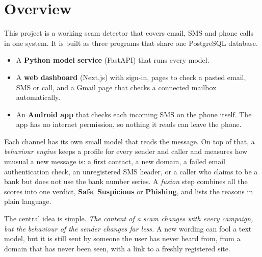 {\section{Overview}
This project is a working scam detector that covers email, SMS and phone calls in one system. It is built as three programs that share one PostgreSQL database.
\begin{itemize}
\item A \textbf{Python model service} (FastAPI) that runs every model.
\item A \textbf{web dashboard} (Next.js) with sign-in, pages to check a pasted email, SMS or call, and a Gmail page that checks a connected mailbox automatically.
\item An \textbf{Android app} that checks each incoming SMS on the phone itself. The app has no internet permission, so nothing it reads can leave the phone.
\end{itemize}

Each channel has its own small model that reads the message. On top of that, a \emph{behaviour engine} keeps a profile for every sender and caller and measures how unusual a new message is: a first contact, a new domain, a failed email authentication check, an unregistered SMS header, or a caller who claims to be a bank but does not use the bank number series. A \emph{fusion} step combines all the scores into one verdict, \textbf{Safe}, \textbf{Suspicious} or \textbf{Phishing}, and lists the reasons in plain language.

The central idea is simple. \emph{The content of a scam changes with every campaign, but the behaviour of the sender changes far less.} A new wording can fool a text model, but it is still sent by someone the user has never heard from, from a domain that has never been seen, with a link to a freshly registered site.

}
